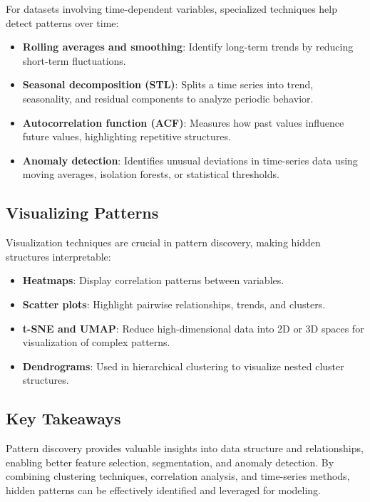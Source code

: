 \documentclass[12pt,openany]{book}
\begin{document}
For datasets involving time-dependent variables, specialized techniques help detect patterns over time:
\begin{itemize}
    \item \textbf{Rolling averages and smoothing}: Identify long-term trends by reducing short-term fluctuations.
    \item \textbf{Seasonal decomposition (STL)}: Splits a time series into trend, seasonality, and residual components to analyze periodic behavior.
    \item \textbf{Autocorrelation function (ACF)}: Measures how past values influence future values, highlighting repetitive structures.
    \item \textbf{Anomaly detection}: Identifies unusual deviations in time-series data using moving averages, isolation forests, or statistical thresholds.
\end{itemize}


\subsection{Visualizing Patterns}

Visualization techniques are crucial in pattern discovery, making hidden structures interpretable:
\begin{itemize}
    \item \textbf{Heatmaps}: Display correlation patterns between variables.
    \item \textbf{Scatter plots}: Highlight pairwise relationships, trends, and clusters.
    \item \textbf{t-SNE and UMAP}: Reduce high-dimensional data into 2D or 3D spaces for visualization of complex patterns.
    \item \textbf{Dendrograms}: Used in hierarchical clustering to visualize nested cluster structures.
\end{itemize}


\subsection{Key Takeaways}

Pattern discovery provides valuable insights into data structure and relationships, enabling better feature selection, segmentation, and anomaly detection. By combining clustering techniques, correlation analysis, and time-series methods, hidden patterns can be effectively identified and leveraged for modeling.
\newline
\end{document}
